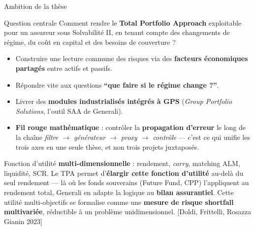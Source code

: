 \documentclass[aspectratio=169,11pt]{beamer}
\newcommand{\highlight}[1]{\textcolor{GeneraliRed}{\textbf{#1}}}
\newcommand{\source}[1]{{\scriptsize\textcolor{Slate!65}{[#1]}}}
\begin{document}
\begin{frame}[shrink=10]{Ambition de la thèse}
  \begin{block}{Question centrale}
    Comment rendre le \highlight{Total Portfolio Approach} exploitable pour un assureur sous Solvabilité II, en tenant compte des changements de régime, du coût en capital et des besoins de couverture ?
  \end{block}

  \begin{itemize}
    \item Construire une lecture commune des risques via des \highlight{facteurs économiques partagés} entre actifs et passifs.
    \item Répondre vite aux questions \highlight{``que faire si le régime change ?''}.
    \item Livrer des \highlight{modules industrialisés intégrés à GPS} (\emph{Group Portfolio Solutions}, l'outil SAA de Generali).
    \item \highlight{Fil rouge mathématique} : contrôler la \highlight{propagation d'erreur} le long de la chaîne \emph{filtre $\to$ générateur $\to$ proxy $\to$ contrôle} — c'est ce qui unifie les trois axes en une seule thèse, et non trois projets juxtaposés.
  \end{itemize}

  {\footnotesize Fonction d'utilité \highlight{multi-dimensionnelle} : rendement, \emph{carry}, matching ALM, liquidité, SCR. Le TPA permet d'\highlight{élargir cette fonction d'utilité} au-delà du seul rendement — là où les fonds souverains (Future Fund, CPP) l'appliquent au rendement total, Generali en adapte la logique au \highlight{bilan assurantiel}. Cette utilité multi-objectifs se formalise comme une \highlight{mesure de risque shortfall multivariée}, réductible à un problème unidimensionnel. \source{Doldi, Frittelli, Rosazza Gianin 2023}}
\end{frame}
\end{document}
